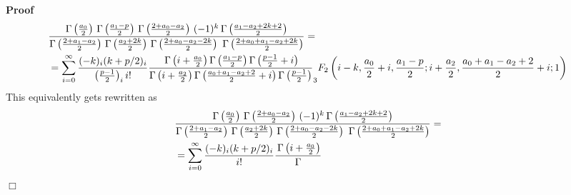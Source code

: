 \documentclass{article}
\renewenvironment{proof}{\noindent\textbf{Proof\ }}{\hspace*{\fill}$\Box$\medskip}
\theoremstyle{remark}
\begin{document}
\begin{proof}
\begin{eqnarray}
    & \frac{\Gamma \left( \frac{a_0}{2} \right)  \hspace{0.17em} \Gamma
    \left( \frac{a_1 - p}{2} \right)  \hspace{0.17em} \Gamma \left( \frac{2 +
    a_0 - a_2}{2} \right)  \hspace{0.17em} (- 1)^k  \hspace{0.17em} \Gamma
    \left( \frac{a_1 - a_2 + 2 k + 2}{2} \right)}{\Gamma \left( \frac{2 + a_1
    - a_2}{2} \right)  \hspace{0.17em} \Gamma \left( \frac{a_2 + 2 k}{2}
    \right)  \hspace{0.17em} \Gamma \left( \frac{2 + a_0 - a_2 - 2 k}{2}
    \right)  \hspace{0.17em}  \hspace{0.17em} \Gamma \left( \frac{2 + a_0 +
    a_1 - a_2 + 2 k}{2} \right)} = &  \nonumber\\
    & = \sum_{i = 0}^{\infty} \frac{(- k)_i (k + p / 2)_i}{\left( \frac{p -
    1}{2} \right)_i i!} \frac{\hspace{0.17em} \Gamma \left( i + \frac{a_0}{2}
    \right) \Gamma \left( \frac{a_1 - p}{2} \right) \Gamma \left( \frac{p -
    1}{2} + i \right)}{\Gamma \left( i + \frac{a_2}{2} \right) \Gamma \left(
    \frac{a_0 + a_1 - a_2 + 2}{2} + i \right) \Gamma \left( \frac{p - 1}{2}
    \right)} _3 F_2 \left( i - k, \frac{a_0}{2} + i, \frac{a_1 - p}{2} ; i +
    \frac{a_2}{2}, \frac{a_0 + a_1 - a_2 + 2}{2} + i ; 1 \right) &  \nonumber
  \end{eqnarray}
  This equivalently gets rewritten as
  \begin{eqnarray}
    & \frac{\Gamma \left( \frac{a_0}{2} \right)  \hspace{0.17em} \Gamma
    \left( \frac{2 + a_0 - a_2}{2} \right)  \hspace{0.17em} (- 1)^k 
    \hspace{0.17em} \Gamma \left( \frac{a_1 - a_2 + 2 k + 2}{2}
    \right)}{\Gamma \left( \frac{2 + a_1 - a_2}{2} \right)  \hspace{0.17em}
    \Gamma \left( \frac{a_2 + 2 k}{2} \right)  \hspace{0.17em} \Gamma \left(
    \frac{2 + a_0 - a_2 - 2 k}{2} \right)  \hspace{0.17em}  \hspace{0.17em}
    \Gamma \left( \frac{2 + a_0 + a_1 - a_2 + 2 k}{2} \right)} = & 
    \nonumber\\
    & = \sum_{i = 0}^{\infty} \frac{(- k)_i (k + p / 2)_i}{i!}
    \frac{\hspace{0.17em} \Gamma \left( i + \frac{a_0}{2} \right)}{\Gamma
}
\end{eqnarray}
\end{proof}
\end{document}
